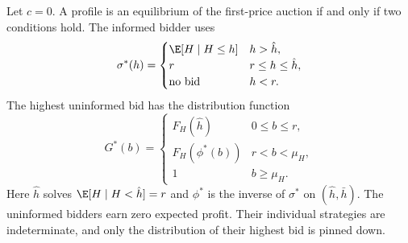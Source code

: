 \begin{proposition}\label{prop:14-emw}
Let $c=0$. A profile is an equilibrium of the first-price auction if and only if two conditions hold. The
informed bidder uses
\begin{equation*}
  \sigma^*(h)=\begin{cases}
  \E[H\mid H\le h] & h>\hat h,\\
  r & r\le h\le\hat h,\\
  \text{no bid} & h<r.
  \end{cases}
\end{equation*}
The highest uninformed bid has the distribution function
\begin{equation*}
  G^*(b)=\begin{cases}
  F_H(\hat h) & 0\le b\le r,\\
  F_H(\phi^*(b)) & r<b<\mu_H,\\
  1 & b\ge\mu_H.
  \end{cases}
\end{equation*}
Here $\hat h$ solves $\E[H\mid H<\hat h]=r$ and $\phi^*$ is the inverse of $\sigma^*$ on $(\hat h,\bar h)$.
The uninformed bidders earn zero expected profit. Their individual strategies are indeterminate, and only
the distribution of their highest bid is pinned down.
\end{proposition}


